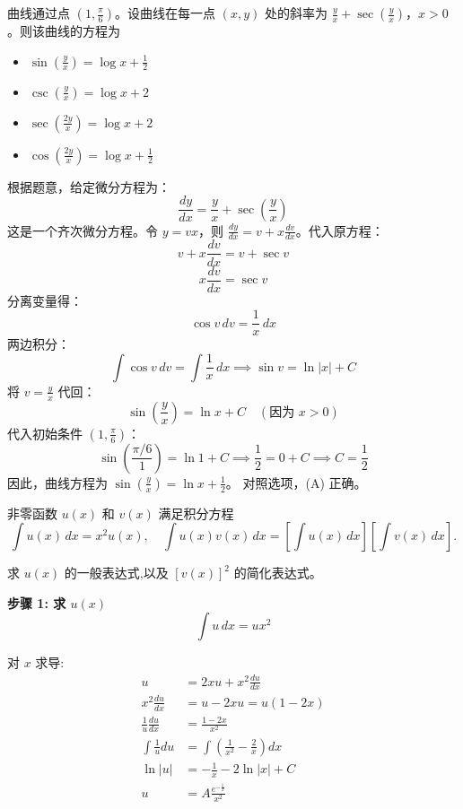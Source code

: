 \begin{questions}
\question 曲线通过点 $\left(1, \frac{\pi}{6}\right)$。设曲线在每一点 $(x, y)$ 处的斜率为 $\frac{y}{x} + \sec\left(\frac{y}{x}\right)$，$x > 0$。则该曲线的方程为
\begin{itemize}
    \item[(A)] $\sin\left(\frac{y}{x}\right) = \log x + \frac{1}{2}$
    \item[(B)] $\csc\left(\frac{y}{x}\right) = \log x + 2$
    \item[(C)] $\sec\left(\frac{2y}{x}\right) = \log x + 2$
    \item[(D)] $\cos\left(\frac{2y}{x}\right) = \log x + \frac{1}{2}$
\end{itemize}

\begin{solution}
根据题意，给定微分方程为：
\[ \frac{dy}{dx} = \frac{y}{x} + \sec\left(\frac{y}{x}\right) \]
这是一个齐次微分方程。令 $y = vx$，则 $\frac{dy}{dx} = v + x\frac{dv}{dx}$。代入原方程：
\[ v + x\frac{dv}{dx} = v + \sec v \]
\[ x\frac{dv}{dx} = \sec v \]
分离变量得：
\[ \cos v \,dv = \frac{1}{x} \,dx \]
两边积分：
\[ \int \cos v \,dv = \int \frac{1}{x} \,dx \implies \sin v = \ln |x| + C \]
将 $v = \frac{y}{x}$ 代回：
\[ \sin\left(\frac{y}{x}\right) = \ln x + C \quad (\text{因为 } x > 0) \]
代入初始条件 $\left(1, \frac{\pi}{6}\right)$：
\[ \sin\left(\frac{\pi/6}{1}\right) = \ln 1 + C \implies \frac{1}{2} = 0 + C \implies C = \frac{1}{2} \]
因此，曲线方程为 $\sin\left(\frac{y}{x}\right) = \ln x + \frac{1}{2}$。
对照选项，(A) 正确。
\end{solution}

\question 非零函数 $u(x)$ 和 $v(x)$ 满足积分方程
\[
\int u(x) \, dx = x^2 u(x), \quad 
\int u(x)v(x)\,dx = \left[\int u(x)\,dx\right]\left[\int v(x)\,dx\right].
\]

求 $u(x)$ 的一般表达式,以及 $[v(x)]^2$ 的简化表达式。

\begin{solution}

\textbf{步骤 1: 求 $u(x)$}
\[
\int u \, dx = u x^2
\]

对 $x$ 求导:
\begin{align*}
u &= 2x u + x^2 \frac{du}{dx} \\
x^2 \frac{du}{dx} &= u - 2xu = u(1-2x) \\
\frac{1}{u} \frac{du}{dx} &= \frac{1-2x}{x^2} \\
\int \frac{1}{u} du &= \int \left( \frac{1}{x^2} - \frac{2}{x} \right) dx \\
\ln|u| &= -\frac{1}{x} - 2\ln|x| + C \\
u &= A \frac{e^{-\frac{1}{x}}}{x^2}
\end{align*}


\end{solution}
\end{questions}
